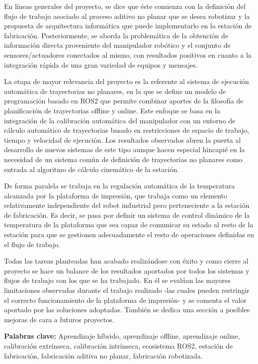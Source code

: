 En líneas generales del proyecto, se dice que éste comienza con la definición del flujo de trabajo asociado al proceso aditivo no planar que se desea robotizar y la propuesta de arquitectura informática que puede implementarlo en la estación de fabricación. Posteriormente, se aborda la problemática de la obtención de información directa proveniente del manipulador robótico y el conjunto de sensores/actuadores conectados al mismo, con resultados positivos en cuanto a la integración rápida de una gran variedad de equipos y mensajes.

La etapa de mayor relevancia del proyecto es la referente al sistema de ejecución automática de trayectorias no planares, en la que se define un modelo de programación basado en ROS2 que permite combinar aportes de la filosofía de planificación de trayectorias offline y online. Este enfoque se basa en la integración de la calibración automática del manipulador con un entorno de cálculo automático de trayectorias basado en restricciones de espacio de trabajo, tiempo y velocidad de ejecución. Los resultados observados abren la puerta al desarrollo de nuevos sistemas de este tipo aunque hacen especial hincapié en la necesidad de un sistema común de definición de trayectorias no planares como entrada al algoritmo de cálculo cinemático de la estación.

De forma paralela se trabaja en la regulación automática de la temperatura alcanzada por la plataforma de impresión, que trabaja como un elemento relativamente independiente del robot industrial pero perteneciente a la estación de fabricación. Es decir, se pasa por definir un sistema de control dinámico de la temperatura de la plataforma que sea capaz de comunicar su estado al resto de la estación para que se gestionen adecuadamente el resto de operaciones definidas en el flujo de trabajo.

Todas las tareas planteadas han acabado realizándose con éxito y como cierre al proyecto se hace un balance de los resultados aportados por todos los sistemas y flujos de trabajo con los que se ha trabajado. En él se evalúan las mayores limitaciones observadas durante el trabajo realizado -las cuales pueden restringir el correcto funcionamiento de la plataforma de impresión- y se comenta el valor aportado por las soluciones adoptadas. También se dedica una sección a posibles mejoras de cara a futuros proyectos.

\textbf{Palabras clave:} Aprendizaje híbrido, aprendizaje offline, aprendizaje online, calibración extrínseca, calibración intrínseca, ecosistema ROS2, estación de fabricación, fabricación aditiva no planar, fabricación robotizada.

